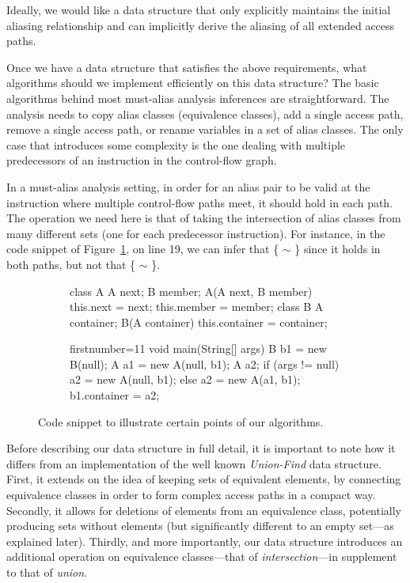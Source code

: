 Ideally, we would like a data structure that only explicitly maintains the initial aliasing relationship and can implicitly derive the aliasing of all extended access paths.


Once we have a data structure that satisfies the above requirements, what algorithms should we implement efficiently on this data structure? The basic algorithms behind most must-alias analysis inferences are straightforward. The analysis needs to copy alias classes (equivalence classes), add a single access path, remove a single access path, or rename variables in a set of alias classes. The only case that introduces some complexity is the one dealing with multiple predecessors of an instruction in the control-flow graph.

In a must-alias analysis setting, in order for an alias pair to be valid at the instruction where multiple control-flow paths meet, it should hold in each path. The operation we need here is that of taking the intersection of alias classes from many different sets (one for each predecessor instruction). For instance, in the code snippet of Figure~\ref{fig:must-data:snippet}, on line 19, we can infer that \{ $\sim$ \} since it holds in both paths, but not that \{ $\sim$ \}.

\begin{figure}[htb!p]
\begin{subfigure}{.45\textwidth}
\begin{javacode}
class A { 
    A next;
    B member;
    A(A next, B member) {
        this.next = next;
        this.member = member; } }
class B {
    A container;
    B(A container) {
        this.container = container; } }
\end{javacode}
\end{subfigure}%
\hfill
\begin{subfigure}{.45\textwidth}
\begin{javacode*}{firstnumber=11}
void main(String[] args) {
    B b1 = new B(null);
    A a1 = new A(null, b1);
    A a2;
    if (args != null) 
        a2 = new A(null, b1);
    else
        a2 = new A(a1, b1);
    b1.container = a2;
}
\end{javacode*}
\end{subfigure}
\caption{Code snippet to illustrate certain points of our algorithms.}
\label{fig:must-data:snippet}
\end{figure}


Before describing our data structure in full detail, it is important to note how it differs from an implementation of the well known \emph{Union-Find} data structure. First, it extends on the idea of keeping sets of equivalent elements, by connecting equivalence classes in order to form complex access paths in a compact way. Secondly, it allows for deletions of elements from an equivalence class, potentially producing sets without elements (but significantly different to an empty set---as explained later). Thirdly, and more importantly, our data structure introduces an additional operation on equivalence classes---that of \emph{intersection}---in supplement to that of \emph{union}.

